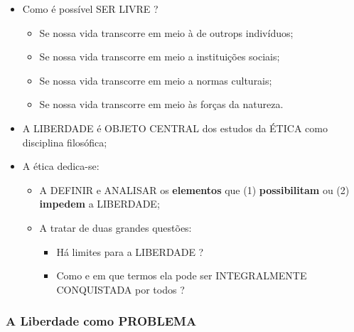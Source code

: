 \documentclass[
]{book}
\providecommand{\tightlist}{%
  \setlength{\itemsep}{0pt}\setlength{\parskip}{0pt}}
\begin{document}
\begin{itemize}
\tightlist
\item
  Como é possível SER LIVRE ?

  \begin{itemize}
  \tightlist
  \item
    Se nossa vida transcorre em meio à de outrops indivíduos;
  \item
    Se nossa vida transcorre em meio a instituições sociais;
  \item
    Se nossa vida transcorre em meio a normas culturais;
  \item
    Se nossa vida transcorre em meio às forças da natureza.
  \end{itemize}
\item
  A LIBERDADE é OBJETO CENTRAL dos estudos da ÉTICA como disciplina filosófica;
\item
  A ética dedica-se:

  \begin{itemize}
  \tightlist
  \item
    A DEFINIR e ANALISAR os \textbf{elementos} que (1) \textbf{possibilitam} ou (2) \textbf{impedem} a LIBERDADE;
  \item
    A tratar de duas grandes questões:

    \begin{itemize}
    \tightlist
    \item
      Há limites para a LIBERDADE ?
    \item
      Como e em que termos ela pode ser INTEGRALMENTE CONQUISTADA por todos ?
    \end{itemize}
  \end{itemize}
\end{itemize}

\hypertarget{a-liberdade-como-problema}{%
\subsubsection{A Liberdade como PROBLEMA}\label{a-liberdade-como-problema}}
\end{document}
